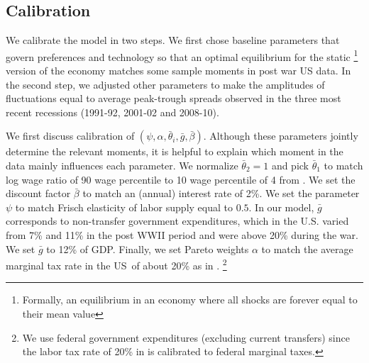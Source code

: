 \documentclass[thmsb,11pt]{article}
\begin{document}
\smallskip

\subsection{\protect\smallskip Calibration}

\smallskip We calibrate the model in two steps. We first chose baseline parameters
that govern preferences and technology so  that an optimal equilibrium for the static%
\footnote{%
Formally, an equilibrium in an economy where all shocks are forever equal to their
mean value} version of the economy matches some sample moments in post war US data.  In the second step, we adjusted other parameters  to make the amplitudes of
fluctuations equal to average peak-trough spreads observed in
the  three most recent recessions (1991-92, 2001-02 and 2008-10).

\smallskip
We first discuss calibration of $\left( \psi ,\alpha ,\bar{\theta}%
_{i},\bar{g},\bar{\beta}\right) $. Although these parameters jointly
determine the relevant moments, it is helpful  to explain which moment
in the data mainly influences each parameter.   We normalize $\bar{\theta}_{2}=1$
and pick $\bar{\theta}_{1}$ to match log wage ratio of 90 wage percentile to
10 wage percentile of 4 from \cite{Autor2008}. We set the discount factor $\bar{\beta}$
 to match an (annual) interest rate of 2\%. We set the parameter $\psi $
to match Frisch elasticity of labor supply equal to $0.5$. In our model, $%
\bar{g}$ corresponds to non-transfer government expenditures, which
in the U.S. varied from 7\%  and  11\% in the post WWII period  and were above 20\% during the war. We set
 $\bar{g}$ to 12\% of GDP. Finally, we set Pareto weights $\alpha $ to match the average
marginal tax rate in the US\ of about 20\% as in \cite{Chari1994}. \footnote{We use federal government expenditures (excluding current transfers) since the labor tax rate of 20\% in  \cite{Chari1994} is calibrated to federal marginal taxes.}
\end{document}
